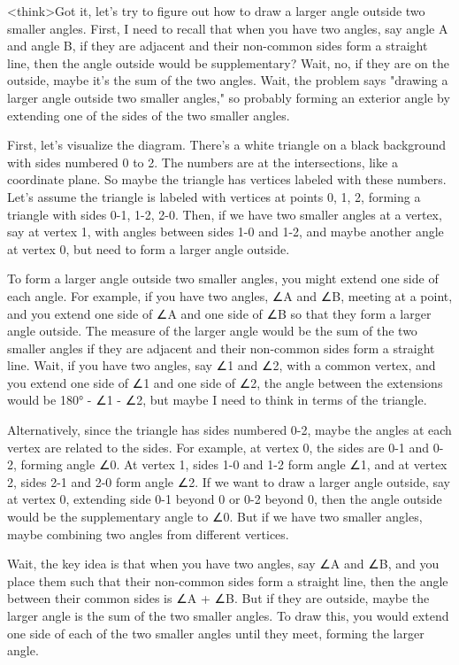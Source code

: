<think>Got it, let's try to figure out how to draw a larger angle outside two smaller angles. First, I need to recall that when you have two angles, say angle A and angle B, if they are adjacent and their non-common sides form a straight line, then the angle outside would be supplementary? Wait, no, if they are on the outside, maybe it's the sum of the two angles. Wait, the problem says "drawing a larger angle outside two smaller angles," so probably forming an exterior angle by extending one of the sides of the two smaller angles. 

First, let's visualize the diagram. There's a white triangle on a black background with sides numbered 0 to 2. The numbers are at the intersections, like a coordinate plane. So maybe the triangle has vertices labeled with these numbers. Let's assume the triangle is labeled with vertices at points 0, 1, 2, forming a triangle with sides 0-1, 1-2, 2-0. Then, if we have two smaller angles at a vertex, say at vertex 1, with angles between sides 1-0 and 1-2, and maybe another angle at vertex 0, but need to form a larger angle outside. 

To form a larger angle outside two smaller angles, you might extend one side of each angle. For example, if you have two angles, ∠A and ∠B, meeting at a point, and you extend one side of ∠A and one side of ∠B so that they form a larger angle outside. The measure of the larger angle would be the sum of the two smaller angles if they are adjacent and their non-common sides form a straight line. Wait, if you have two angles, say ∠1 and ∠2, with a common vertex, and you extend one side of ∠1 and one side of ∠2, the angle between the extensions would be 180° - ∠1 - ∠2, but maybe I need to think in terms of the triangle. 

Alternatively, since the triangle has sides numbered 0-2, maybe the angles at each vertex are related to the sides. For example, at vertex 0, the sides are 0-1 and 0-2, forming angle ∠0. At vertex 1, sides 1-0 and 1-2 form angle ∠1, and at vertex 2, sides 2-1 and 2-0 form angle ∠2. If we want to draw a larger angle outside, say at vertex 0, extending side 0-1 beyond 0 or 0-2 beyond 0, then the angle outside would be the supplementary angle to ∠0. But if we have two smaller angles, maybe combining two angles from different vertices. 

Wait, the key idea is that when you have two angles, say ∠A and ∠B, and you place them such that their non-common sides form a straight line, then the angle between their common sides is ∠A + ∠B. But if they are outside, maybe the larger angle is the sum of the two smaller angles. To draw this, you would extend one side of each of the two smaller angles until they meet, forming the larger angle. 

